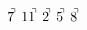 \documentclass[preview]{standalone}
\begin{document}
\begin{align*}
7^{\hspace{-0.1cm}\urcorner} \ 11^{\hspace{-0.1cm}\urcorner} \ 2^{\hspace{-0.1cm}\urcorner} \ 5^{\hspace{-0.1cm}\urcorner} \ 8^{\hspace{-0.1cm}\urcorner}
\end{align*}
\end{document}
